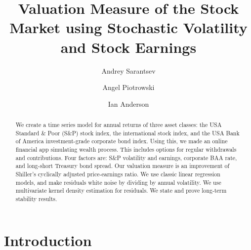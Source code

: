 \documentclass[12pt]{amsart}
\begin{document}
\newtheorem{theorem}{Theorem}
\newtheorem{lemma}{Lemma}
\newtheorem{asmp}{Assumption}

\title[Valuation using Volatility and Earnings]{Valuation Measure of the Stock Market using Stochastic Volatility and Stock Earnings}

\author{Andrey Sarantsev}

\address{Department of Mathematics and Statistics, University of Nevada, Reno}


\author{Angel Piotrowski}

\author{Ian Anderson}

\begin{abstract}
We create a time series model for annual returns of three asset classes: the USA Standard \& Poor (S\&P) stock index, the international stock index, and the USA Bank of America investment-grade corporate bond index. Using this, we made an online financial app simulating wealth process. This includes options for regular withdrawals and contributions. Four factors are: S\&P volatility and earnings, corporate BAA rate, and long-short Treasury bond spread. Our valuation measure is an improvement of Shiller's cyclically adjusted price-earnings ratio. We use classic linear regression models, and make residuals white noise by dividing by annual volatility. We use multivariate kernel density estimation for residuals. We state and prove long-term stability results. 
\end{abstract}


\maketitle

\thispagestyle{empty}

\section{Introduction}
\end{document}
